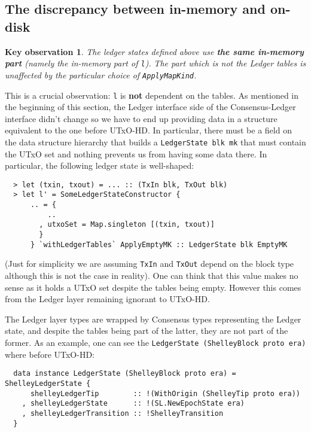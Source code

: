 \documentclass[11pt,a4paper]{article}
\theoremstyle{definition}
\newtheorem{observation}{Key observation}
\begin{document}
\subsection{The discrepancy between in-memory and on-disk}
\begin{observation}
  \emph{The ledger states defined above use \textbf{the same in-memory part} (namely the in-memory part of \texttt{l}).}
  \emph{The part which is not the Ledger tables is unaffected by the particular choice of \texttt{ApplyMapKind}.}
\end{observation}

This is a crucial observation: \texttt{l} is \textbf{not} dependent on the
tables. As mentioned in the beginning of this section, the Ledger interface side
of the Consensus-Ledger interface didn't change so we have to end up providing
data in a structure equivalent to the one before UTxO-HD. In particular, there
must be a field on the data structure hierarchy that builds a
\texttt{LedgerState blk mk} that must contain the UTxO set and nothing prevents
us from having some data there. In particular, the following ledger state is well-shaped:

\begin{lstlisting}
  > let (txin, txout) = ... :: (TxIn blk, TxOut blk)
  > let l' = SomeLedgerStateConstructor {
      .. = {
          ..
        , utxoSet = Map.singleton [(txin, txout)]
        }
      } `withLedgerTables` ApplyEmptyMK :: LedgerState blk EmptyMK
\end{lstlisting}

(Just for simplicity we are assuming \texttt{TxIn} and \texttt{TxOut} depend on
the block type although this is not the case in reality). One can think that
this value makes no sense as it holds a UTxO set despite the tables being empty.
However this comes from the Ledger layer remaining ignorant to UTxO-HD.

The Ledger layer types are wrapped by Consensus types representing the Ledger
state, and despite the tables being part of the latter, they are not part of the
former. As an example, one can see the \texttt{LedgerState (ShelleyBlock proto
  era)} where before UTxO-HD:

\begin{lstlisting}
  data instance LedgerState (ShelleyBlock proto era) = ShelleyLedgerState {
      shelleyLedgerTip        :: !(WithOrigin (ShelleyTip proto era))
    , shelleyLedgerState      :: !(SL.NewEpochState era)
    , shelleyLedgerTransition :: !ShelleyTransition
  }
\end{lstlisting}
\end{document}
